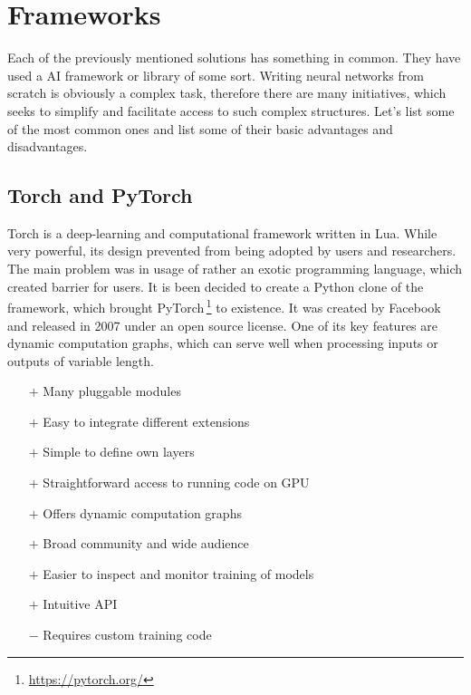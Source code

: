 

\section{Frameworks}

Each of the previously mentioned solutions has something in common. They have used a AI framework or library of some sort. Writing neural networks from scratch is obviously a complex task, therefore there are many initiatives, which seeks to simplify and facilitate access to such complex structures. Let's list some of the most common ones and list some of their basic advantages and disadvantages.

\subsection{Torch and PyTorch}

Torch is a deep-learning and computational framework written in Lua. While very powerful, its design prevented from being adopted by users and researchers. The main problem was in usage of rather an exotic programming language, which created barrier for users. It is been decided to create a Python clone of the framework, which brought PyTorch\,\footnote{\url{https://pytorch.org/}} to existence. It was created by Facebook and released in 2007 under an open source license. One of its key features are dynamic computation graphs, which can serve well when processing inputs or outputs of variable length.

\begin{itemize}
    \item[$\boldsymbol{+}$] Many pluggable modules
    \item[$\boldsymbol{+}$] Easy to integrate different extensions
    \item[$\boldsymbol{+}$] Simple to define own layers
    \item[$\boldsymbol{+}$] Straightforward access to running code on GPU
    \item[$\boldsymbol{+}$] Offers dynamic computation graphs
    \item[$\boldsymbol{+}$] Broad community and wide audience
    \item[$\boldsymbol{+}$] Easier to inspect and monitor training of models
    \item[$\boldsymbol{+}$] Intuitive API
    \item[$\boldsymbol{-}$] Requires custom training code
\end{itemize}

